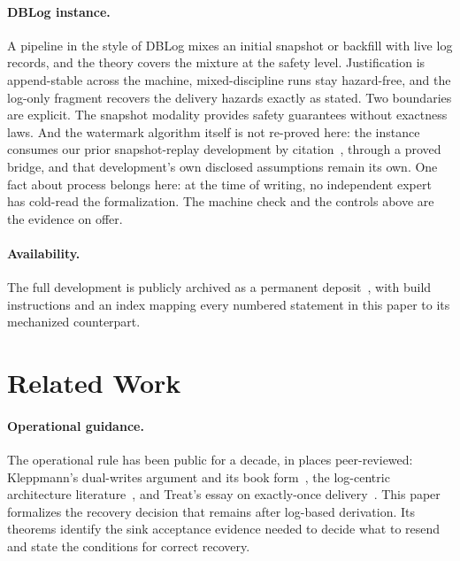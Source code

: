 \documentclass[sigplan,10pt]{acmart}
\theoremstyle{plain}
\theoremstyle{definition}
\begin{document}
\paragraph{DBLog instance.}
A pipeline in the style of DBLog mixes an initial snapshot or
backfill with live log records, and the theory covers the mixture at
the safety level. Justification is append-stable across the machine,
mixed-discipline runs stay hazard-free, and the log-only fragment
recovers the delivery hazards exactly as stated. Two boundaries are
explicit. The snapshot modality provides safety guarantees without exactness
laws. And the watermark algorithm itself is not re-proved here: the
instance consumes our prior snapshot-replay development by
citation~\cite{own-arxiv}, through a proved bridge, and that
development's own disclosed assumptions remain its own. One fact
about process belongs here: at the time of writing, no
independent expert has cold-read the formalization. The machine check
and the controls above are the evidence on offer.

\paragraph{Availability.}
The full development is publicly archived as a permanent
deposit~\cite{dual-write-recovery-artifact}, with build instructions
and an index mapping every numbered statement in this paper to its
mechanized counterpart.

\section{Related Work}\label{sec:related}

\paragraph{Operational guidance.}
The operational rule has been public for a decade, in places
peer-reviewed: Kleppmann's dual-writes argument and its book
form~\cite{kleppmann2015dualwrites,ddia}, the log-centric architecture
literature~\cite{kleppmann2019olep}, and Treat's essay on
exactly-once delivery~\cite{treat}. This paper formalizes the recovery
decision that remains after
log-based derivation. Its theorems identify the sink acceptance evidence
needed to decide what to resend and state the conditions for correct
recovery.
\end{document}
